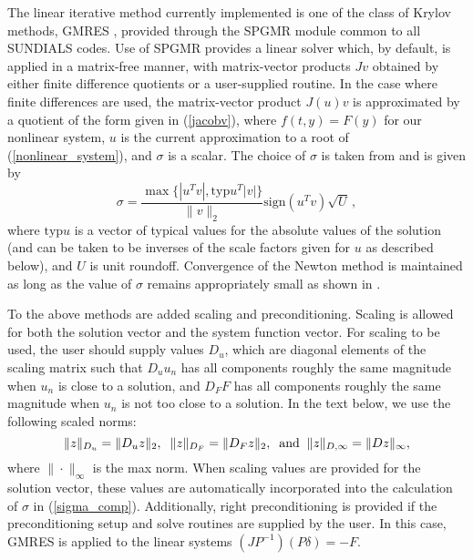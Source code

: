 The linear iterative method currently implemented is one of the class of
Krylov methods, GMRES \cite{BrHi:89,SaSc:86},
provided through the SPGMR module common to all SUNDIALS codes.
Use of SPGMR provides a linear solver which, by default, is applied in a
matrix-free manner, with matrix-vector products $Jv$ obtained by either
finite difference quotients or a user-supplied routine.
In the case where finite differences are used,
the matrix-vector product $J(u)v$ is approximated by a quotient of the form
given in (\ref{jacobv}),
where $f(t, y) = F(y)$ for our nonlinear system,
$u$ is the current approximation to a root of (\ref{nonlinear_system}),
and $\sigma$ is a scalar.  The choice of $\sigma$ is taken from
\cite{BrSa:90} and is given by
\begin{equation}\label{sigma_comp}
  \sigma = \frac{\max \{|u^T v|, \mbox{typ}u^T |v|\}}{\|v\|_2}
  \mbox{sign}(u^T v) \sqrt{U} \, ,
\end{equation}
where $\mbox{typ}u$ is a vector of typical values for the absolute
values of the solution (and can be taken to be inverses of the scale
factors given for $u$ as described below), and $U$ is unit roundoff.
Convergence of the Newton method is maintained as long as the value of
$\sigma$ remains appropriately small as shown in \cite{Bro:87}.

To the above methods are added scaling and preconditioning.
Scaling is allowed for both the solution vector and the system
function vector. For scaling to be used, the user should supply
values $D_u$, which are diagonal elements of the scaling matrix
such that $D_u u_n$ has all components roughly the same magnitude
when $u_n$ is close to a solution, and $D_F F$ has all components
roughly the same magnitude when $u_n$ is not too close to a
solution. In the text below, we use the following scaled norms:
\begin{equation}
\|z\|_{D_u} = \|D_u z\|_2, \;\; \|z\|_{D_F} = \|D_F z\|_2, \;\;
{\rm and} \;\; \|z\|_{D,\infty} = \|Dz\|_{\infty},
\end{equation}
where $\| \cdot \|_{\infty}$ is the max norm.  When scaling values
are provided for the solution vector, these values are
automatically incorporated into the calculation of $\sigma$ in
(\ref{sigma_comp}). Additionally, right preconditioning is
provided if the preconditioning setup and solve routines are
supplied by the user. In this case, GMRES is applied to the linear
systems $(JP^{-1})(P\delta) = -F$.

